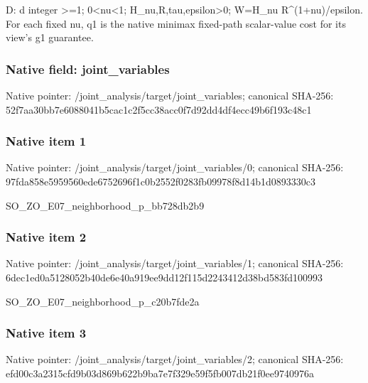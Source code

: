 \documentclass[10pt,a4paper]{article}
\begin{document}
\begingroup\raggedright\sloppy D:\allowbreak{} d integer >=\allowbreak{}1;\allowbreak{} 0<nu<1;\allowbreak{} H\_\allowbreak{}nu,\allowbreak{}R,\allowbreak{}tau,\allowbreak{}epsilon>0;\allowbreak{} W=\allowbreak{}H\_\allowbreak{}nu R\textasciicircum{}(1+nu)/\allowbreak{}epsilon. For each fixed nu,\allowbreak{} q1 is the native minimax fixed-path scalar-value cost for its view's g1 guarantee.\par\endgroup

\subsubsection{Native field: joint\_\allowbreak{}variables}
Native pointer: /joint\_\allowbreak{}analysis/target/joint\_\allowbreak{}variables; canonical SHA-256: 52f7aa30bb7e6088041b5cac1c2f5cc38acc0f7d92dd4df4ecc49b6f193c48c1

\subsubsection{Native item 1}
Native pointer: /joint\_\allowbreak{}analysis/target/joint\_\allowbreak{}variables/0; canonical SHA-256: 97fda858e5959560ede6752696f1c0b2552f0283fb09978f8d14b1d0893330c3

\begingroup\raggedright\sloppy SO\_\allowbreak{}ZO\_\allowbreak{}E07\_\allowbreak{}neighborhood\_\allowbreak{}p\_\allowbreak{}bb728db2b9\par\endgroup

\subsubsection{Native item 2}
Native pointer: /joint\_\allowbreak{}analysis/target/joint\_\allowbreak{}variables/1; canonical SHA-256: 6dec1ed0a5128052b40de6e40a919ee9dd12f115d2243412d38bd583fd100993

\begingroup\raggedright\sloppy SO\_\allowbreak{}ZO\_\allowbreak{}E07\_\allowbreak{}neighborhood\_\allowbreak{}p\_\allowbreak{}c20b7fde2a\par\endgroup

\subsubsection{Native item 3}
Native pointer: /joint\_\allowbreak{}analysis/target/joint\_\allowbreak{}variables/2; canonical SHA-256: efd00c3a2315cfd9b03d869b622b9ba7e7f329e59f5fb007db21f0ee9740976a
\end{document}

